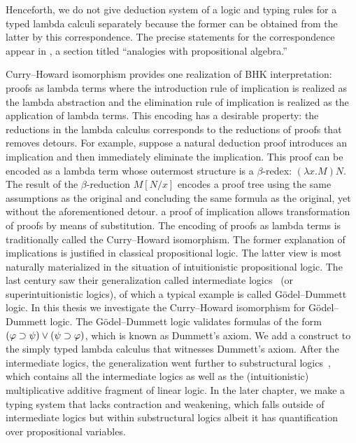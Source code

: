  Henceforth, we do not give deduction system of a logic and
 typing rules for a typed lambda calculi separately because
 the former can be obtained from the latter by this correspondence.
The
precise statements for the correspondence appear in
\citet[9E]{curry1974combinatory}, a section titled ``analogies with
propositional algebra.''

Curry--Howard isomorphism provides
one realization of BHK interpretation: proofs as lambda terms where the
introduction rule of implication is realized as the lambda abstraction
and the elimination rule of implication is realized as the application
of lambda terms.
This encoding has a desirable property:
the reductions in the lambda calculus corresponds to the reductions of
proofs that
removes detours.
For example, suppose a natural deduction proof introduces an implication and then
immediately eliminate the
implication.  This proof can be encoded as a lambda term whose outermost
structure is a $\beta$-redex: $(\lambda x. M)N$.
 The result of the $\beta$-reduction $M[N/x]$ encodes a proof tree using
 the same assumptions as the original and concluding the same formula as
 the original, yet without the aforementioned detour.
 a proof of implication allows transformation of proofs
by means of
substitution.  The encoding of proofs as lambda terms is traditionally
called the Curry--Howard isomorphism.
The former explanation of implications is justified in classical propositional logic.
The latter view is most naturally materialized in the situation of
intuitionistic propositional logic.  The last century saw their
generalization called intermediate logics~\citep{umezawa} (or superintuitionistic
logics), of which a typical example is
called G\"odel--Dummett logic.
In this thesis we investigate the Curry--Howard isomorphism for
G\"odel--Dummett logic.  The G\"odel--Dummett
logic validates formulas
of the form $(\varphi\supset\psi)\lor(\psi\supset\varphi)$, which is known as
Dummett's axiom.  We add a construct to the simply typed lambda
calculus
that witnesses Dummett's axiom.
After the intermediate logics, the generalization went further to
substructural
logics~\citep{residuated}, which contains all the intermediate logics as
well as the
(intuitionistic) multiplicative
additive fragment of linear logic.
In the later chapter, we make a typing system that lacks contraction and
weakening, which falls outside of intermediate logics but within
substructural logics albeit it has quantification over propositional variables.

